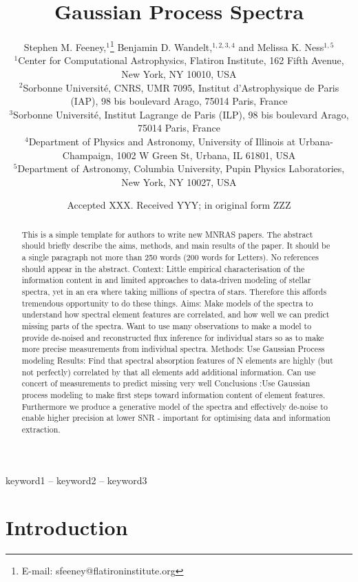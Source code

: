 \documentclass[a4paper,fleqn,usenatbib]{mnras}
\title[Gaussian Process Spectra]{Gaussian Process Spectra}
\author[S. M. Feeney et al.]{
Stephen M. Feeney,$^{1}$\thanks{E-mail: sfeeney@flatironinstitute.org}
Benjamin D. Wandelt,$^{1,2,3,4}$
and Melissa K. Ness$^{1,5}$
\\
$^{1}$Center for Computational Astrophysics, Flatiron Institute, 162 Fifth Avenue, New York, NY 10010, USA\\
$^{2}$Sorbonne Universit\'e, CNRS, UMR 7095,  Institut d'Astrophysique de Paris (IAP), 98 bis boulevard Arago, 75014 Paris, France\\
$^{3}$Sorbonne Universit\'e, Institut Lagrange de Paris (ILP), 98 bis boulevard Arago, 75014 Paris, France\\
$^{4}$Department of Physics and Astronomy, University of Illinois at Urbana-Champaign, 1002 W Green St, Urbana, IL 61801, USA\\
$^{5}$Department of Astronomy, Columbia University, Pupin Physics Laboratories, New York, NY 10027, USA
}
\date{Accepted XXX. Received YYY; in original form ZZZ}
\begin{document}
\label{firstpage}
\pagerange{\pageref{firstpage}--\pageref{lastpage}}
\maketitle

\begin{abstract}
This is a simple template for authors to write new MNRAS papers.
The abstract should briefly describe the aims, methods, and main results of the paper.
It should be a single paragraph not more than 250 words (200 words for Letters).
No references should appear in the abstract.
Context: Little empirical characterisation of the information content in and limited approaches to data-driven modeling of stellar spectra, yet in an era where taking millions of spectra of stars. Therefore this affords tremendous opportunity to do these things.   
Aims: Make models of the spectra to understand how spectral element features are correlated, and how well we can predict missing parts of the spectra. Want to use many observations to make a model to provide de-noised and reconstructed flux inference for individual stars so as to make more precise measurements from individual spectra. 
Methods: Use Gaussian Process modeling
Results: Find that spectral absorption features of N elements are highly (but not perfectly) correlated by that all elements add additional information. Can use concert of measurements to predict missing very well
Conclusions :Use Gaussian process modeling to make first steps toward information content of element features. Furthermore we produce a generative model of the spectra and effectively de-noise to enable higher precision at lower SNR - important for optimising data and information extraction. 
\end{abstract}

\begin{keywords}
keyword1 -- keyword2 -- keyword3
\end{keywords}


\section{Introduction}
\end{document}
